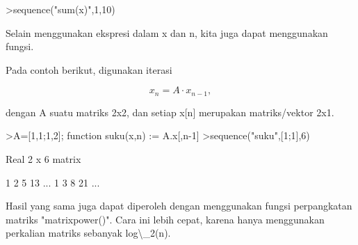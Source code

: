 \documentclass{article}
\begin{document}
\begin{eulernotebook}
\begin{eulercomment}
\begin{eulercomment}
\begin{eulercomment}
\begin{eulercomment}
\begin{eulercomment}
\begin{eulercomment}
\begin{eulercomment}
\begin{eulercomment}
\begin{eulercomment}
\begin{eulercomment}
\begin{eulercomment}
\begin{eulercomment}
\begin{eulercomment}
\begin{eulercomment}
\begin{eulercomment}
\begin{eulercomment}
\begin{eulercomment}
\begin{eulercomment}
\begin{eulercomment}
\begin{eulercomment}
\begin{eulercomment}
\begin{eulercomment}
\begin{eulercomment}
\begin{eulercomment}
\begin{eulercomment}
\begin{eulercomment}
\begin{eulercomment}
\begin{eulercomment}
\begin{eulercomment}
\end{eulercomment}
\begin{eulerprompt}
>sequence("sum(x)",1,10)
\end{eulerprompt}
\begin{euleroutput}
  [1,  1,  2,  4,  8,  16,  32,  64,  128,  256]
\end{euleroutput}
\begin{eulercomment}
Selain menggunakan ekspresi dalam x dan n, kita juga dapat menggunakan
fungsi.

Pada contoh berikut, digunakan iterasi

\end{eulercomment}
\begin{eulerformula}
\[
x_n =A \cdot x_{n-1},
\]
\end{eulerformula}
\begin{eulercomment}
dengan A suatu matriks 2x2, dan setiap x[n] merupakan matriks/vektor
2x1.
\end{eulercomment}
\begin{eulerprompt}
>A=[1,1;1,2]; function suku(x,n) := A.x[,n-1]
>sequence("suku",[1;1],6)
\end{eulerprompt}
\begin{euleroutput}
  Real 2 x 6 matrix
  
              1             2             5            13     ...
              1             3             8            21     ...
\end{euleroutput}
\begin{eulercomment}
Hasil yang sama juga dapat diperoleh dengan menggunakan fungsi
perpangkatan matriks "matrixpower()". Cara ini lebih cepat, karena
hanya menggunakan perkalian matriks sebanyak log\textbackslash{}\_2(n).


\end{eulercomment}
\end{eulercomment}
\end{eulercomment}
\end{eulercomment}
\end{eulercomment}
\end{eulercomment}
\end{eulercomment}
\end{eulercomment}
\end{eulercomment}
\end{eulercomment}
\end{eulercomment}
\end{eulercomment}
\end{eulercomment}
\end{eulercomment}
\end{eulercomment}
\end{eulercomment}
\end{eulercomment}
\end{eulercomment}
\end{eulercomment}
\end{eulercomment}
\end{eulercomment}
\end{eulercomment}
\end{eulercomment}
\end{eulercomment}
\end{eulercomment}
\end{eulercomment}
\end{eulercomment}
\end{eulercomment}
\end{eulercomment}
\end{eulernotebook}
\end{document}
